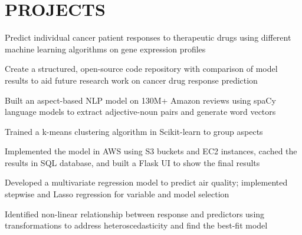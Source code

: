 \documentclass[]{deedy-resume-openfont}
\begin{document}
\begin{minipage}[t]{0.66\textwidth}
\begin{tightemize}
\end{tightemize}


\section{PROJECTS}
\begin{tightemize}
\item Predict individual cancer patient responses to therapeutic drugs using different machine learning algorithms on gene expression profiles
\item Create a structured, open-source code repository with comparison of model results to aid future research work on cancer drug response prediction
\end{tightemize}
\sectionsep

\begin{tightemize}
\item Built an aspect-based NLP model on 130M+ Amazon reviews using spaCy language models to extract adjective-noun pairs and generate word vectors
\item  Trained a k-means clustering algorithm in Scikit-learn to group aspects
\item Implemented the model in AWS using S3 buckets and EC2 instances, cached the results in SQL database, and built a Flask UI to show the final results 
\end{tightemize}
\sectionsep

\begin{tightemize}
\item Developed a multivariate regression model to predict air quality; implemented stepwise and Lasso regression for variable and model selection
\item Identified non-linear relationship between response and predictors using transformations to address heteroscedasticity and find the best-fit model
\end{tightemize}



\end{minipage}
\end{document}
